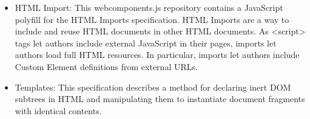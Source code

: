 \begin{itemize}
\item HTML Import: This webcomponents.js repository contains a JavaScript polyfill for the HTML Imports specification. HTML Imports are a way to include and reuse HTML documents in other HTML documents. As <script> tags let authors include external JavaScript in their pages, imports let authors load full HTML resources. In particular, imports let authors include Custom Element definitions from external URLs.
\end{itemize}
\begin{itemize}
\item Templates: This specification describes a method for declaring inert DOM subtrees in HTML and manipulating them to instantiate document fragments with identical contents.
\end{itemize}